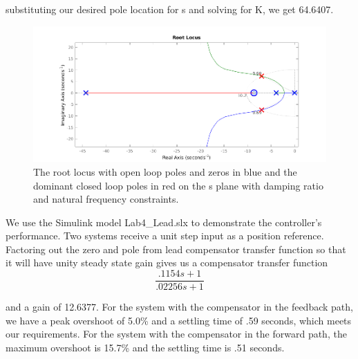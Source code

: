 \documentclass[11pt,a4paper]{article}
\begin{document}
 substituting our desired pole location for s and solving for K,  we get 64.6407. 
 
 
\begin{figure}[!htbp]
	\includegraphics[width=\textwidth]{imglab/lab4sol_leadpoles.png}
	\caption{ The root locus with open loop poles and zeros in blue and the dominant closed loop poles in red on the s plane with damping ratio and natural frequency constraints.}
\end{figure}



We use the Simulink model Lab4\_Lead.slx to demonstrate the controller's performance. Two systems receive a unit step input as a position reference. Factoring out the zero and pole from lead compensator transfer function so that it will have unity steady state gain gives us a compensator transfer function
\begin{equation}
	\frac{.1154s + 1}{.02256s + 1}
\end{equation}

and a gain of 12.6377. For the system with the compensator in the feedback path, we have a peak overshoot of 5.0\% and a settling time of .59 seconds, which meets our requirements. For the system with the compensator in the forward path, the maximum overshoot is 15.7\% and the settling time is .51 seconds.
\end{document}
